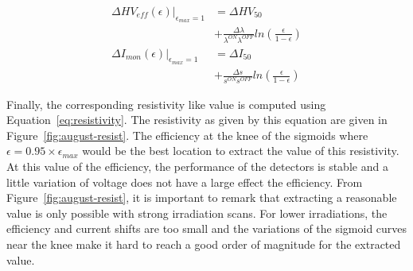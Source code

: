	\begin{equation}
	\label{eq:shifts}
		\begin{aligned}
	\Delta HV_{eff}(\epsilon)\vert_{\epsilon_{max}=1} &= \Delta HV_{50}\\
	&+ \frac{\Delta\lambda}{\lambda^{ON}\lambda^{OFF}}ln\left(\frac{\epsilon}{1-\epsilon}\right)\\
	\Delta I_{mon}(\epsilon)\vert_{\epsilon_{max}=1} &= \Delta I_{50}\\
	&+ \frac{\Delta s}{s^{ON}s^{OFF}}ln\left(\frac{\epsilon}{1-\epsilon}\right)
		\end{aligned}
	\end{equation}
	
	Finally, the corresponding resistivity like value is computed using Equation~\ref{eq:resistivity}. The resistivity as given by this equation are given in Figure~\ref{fig:august-resist}. The efficiency at the knee of the sigmoids where $\epsilon = 0.95 \times \epsilon_{max}$ would be the best location to extract the value of this resistivity. At this value of the efficiency, the performance of the detectors is stable and a little variation of voltage does not have a large effect the efficiency. From Figure~\ref{fig:august-resist}, it is important to remark that extracting a reasonable value is only possible with strong irradiation scans. For lower irradiations, the efficiency and current shifts are too small and the variations of the sigmoid curves near the knee make it hard to reach a good order of magnitude for the extracted value.
	
\endgroup
	
